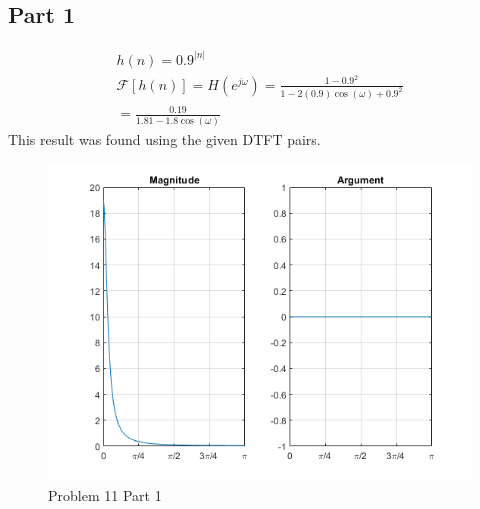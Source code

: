 \documentclass{article}
\begin{document}
\subsection*{Part 1}
\begin{gather*}
    h(n) = 0.9^{|n|}\\
    \mathcal{F}[h(n)] = H\left(e^{j\omega}\right) = \frac{1 - 0.9^2}{1 - 2(0.9)\cos(\omega) + 0.9^2}\\
    = \frac{0.19}{1.81 - 1.8\cos(\omega)}
\end{gather*}
This result was found using the given DTFT pairs.
\begin{figure}[H]
    \centering
    \includegraphics[width=\textwidth]{html/Homework3_16.png}
    \caption{Problem 11 Part 1}
    \label{3.11.1}
\end{figure}
\end{document}
